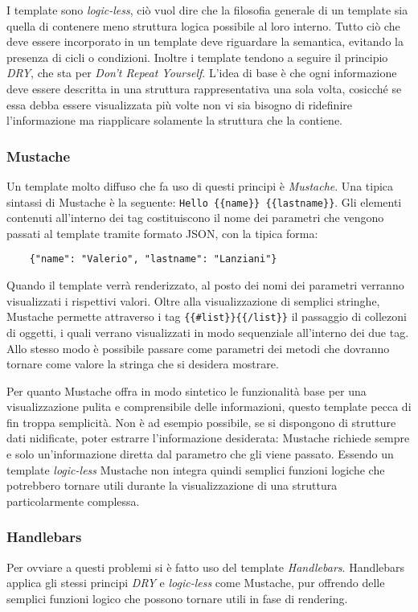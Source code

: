 I template sono {\itshape logic-less}, ciò vuol dire che la filosofia generale di un template sia quella di contenere meno struttura logica possibile al loro interno. Tutto ciò che deve essere incorporato in un template deve riguardare la semantica, evitando la presenza di cicli o condizioni. Inoltre i template tendono a seguire il principio {\itshape DRY}, che sta per {\itshape Don't Repeat Yourself}. L'idea di base è che ogni informazione deve essere descritta in una struttura rappresentativa una sola volta, cosicché se essa debba essere visualizzata più volte non vi sia bisogno di ridefinire l'informazione ma riapplicare solamente la struttura che la contiene.

\subsubsection{Mustache} %
\label{ssub:mustache}
Un template molto diffuso che fa uso di questi principi è {\itshape Mustache}.
Una tipica sintassi di Mustache è la seguente: \lstinline!Hello {{name}} {{lastname}}!. Gli elementi contenuti all'interno dei tag {{}} costituiscono il nome dei parametri che vengono passati al template tramite formato JSON, con la tipica forma:
\begin{lstlisting}
    {"name": "Valerio", "lastname": "Lanziani"}
\end{lstlisting}
Quando il template verrà renderizzato, al posto dei nomi dei parametri verranno visualizzati i rispettivi valori. Oltre alla visualizzazione di semplici stringhe, Mustache permette attraverso i tag \lstinline!{{#list}}{{/list}}! il passaggio di collezoni di oggetti, i quali verrano visualizzati in modo sequenziale all'interno dei due tag. Allo stesso modo è possibile passare come parametri dei metodi che dovranno tornare come valore la stringa che si desidera mostrare.

Per quanto Mustache offra in modo sintetico le funzionalità base per una visualizzazione pulita e comprensibile delle informazioni, questo template pecca di fin troppa semplicità.
Non è ad esempio possibile, se si dispongono di strutture dati nidificate, poter estrarre l'informazione desiderata: Mustache richiede sempre e solo un'informazione diretta dal parametro che gli viene passato.
Essendo un template {\itshape logic-less} Mustache non integra quindi semplici funzioni logiche che potrebbero tornare utili durante la visualizzazione di una struttura particolarmente complessa.

\subsubsection{Handlebars} %
\label{ssub:handlebars}
Per ovviare a questi problemi si è fatto uso del template {\itshape Handlebars}.
Handlebars applica gli stessi principi {\itshape DRY} e {\itshape logic-less} come Mustache, pur offrendo delle semplici funzioni logico che possono tornare utili in fase di rendering.

